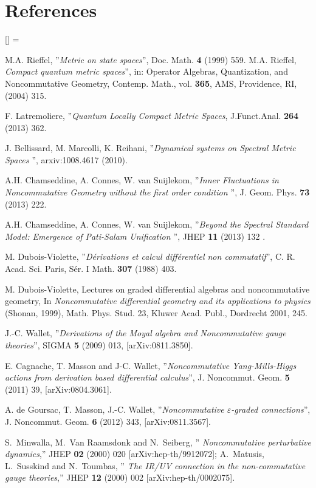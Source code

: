 \documentclass[a4paper,11pt,twoside]{article}
\numberwithin{equation}{section}
\theoremstyle{nonumberplain}
\newcounter{and}
\renewenvironment{thebibliography}[1]{%
\section*{References}%
\frenchspacing\small%
\begin{list}{[\arabic{enumi}]}%
{%
\usecounter{enumi}\parsep=2pt\topsep 0pt%
\settowidth{\labelwidth}{[#1]}%
\leftmargin=\labelwidth\advance\leftmargin\labelsep%
\rightmargin=0pt\itemsep=1pt\sloppy%
}%
}{\end{list}}
\begin{document}
\begin{thebibliography}{50}
 M.A. Rieffel, ''{\it{Metric on state spaces}}'', Doc. Math. {\bf{4}} (1999) 559. M.A. Rieffel, {\it{Compact quantum metric spaces}}'', in: Operator Algebras, Quantization, and Noncommutative Geometry, Contemp. Math., vol. {\bf{365}},
AMS, Providence, RI, (2004) 315.

 F. Latremoliere, ''{\it{Quantum Locally Compact Metric Spaces}}, J.Funct.Anal. {\bf{264}} (2013) 362. 

 J. Bellissard, M. Marcolli, K. Reihani, ''{\it{Dynamical systems on Spectral Metric Spaces }}'', arxiv:1008.4617 (2010).

 A.H. Chamseddine, A. Connes, W. van Suijlekom, ''{\it{Inner Fluctuations in Noncommutative Geometry without the first order condition }}'', J. Geom. Phys. {\bf{73}} (2013) 222.

 A.H. Chamseddine, A. Connes, W. van Suijlekom, ''{\it{Beyond the Spectral Standard Model: Emergence of Pati-Salam Unification }}'', JHEP {\bf{11}} (2013) 132 .

 M. Dubois-Violette, ''{\it{D\'erivations et calcul diff\'erentiel non commutatif}}'', C. R. Acad. Sci.
Paris, S\'er. I Math. {\bf{307}} (1988) 403.

 M. Dubois-Violette, Lectures on graded differential algebras and noncommutative geometry, In {\it{Noncommutative differential geometry and its applications to physics}} (Shonan, 1999), Math. Phys. Stud. 23, Kluwer Acad. Publ., Dordrecht 2001, 245.

 J.-C. Wallet, ''{\it{Derivations of the Moyal algebra and Noncommutative gauge theories}}'', SIGMA {\bf{5}} (2009) 013, [arXiv:0811.3850].

E. Cagnache, T. Masson and J-C. Wallet, ''{\it{Noncommutative Yang-Mills-Higgs actions from derivation based differential calculus}}'', J. Noncommut. Geom. {\bf{5}} (2011) 39, [arXiv:0804.3061].

A. de Goursac, T. Masson, J.-C. Wallet, ''{\it{Noncommutative $\varepsilon$-graded connections}}'', J. Noncommut. Geom. {\bf{6}} (2012) 343, [arXiv:0811.3567].

 S.~Minwalla, M.~Van Raamsdonk and N.~Seiberg, ''{\it{ Noncommutative perturbative dynamics}},''
  JHEP {\bf 02} (2000) 020 [arXiv:hep-th/9912072]; A.~Matusis, L.~Susskind and N.~Toumbas, ''{\it{ The IR/UV connection in the non-commutative gauge theories}},''
JHEP {\bf 12} (2000) 002 [arXiv:hep-th/0002075].



\end{thebibliography}
\end{document}
